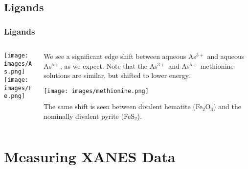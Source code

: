 \documentclass[10pt, xcolor=x11names, compress]{beamer}
\begin{document}
\subsection{Ligands}
\begin{frame}
  \frametitle{Ligands}


  \begin{columns}
    \begin{column}{0.6\linewidth}
      \texttt{[image: images/As.png]}\\
      \texttt{[image: images/Fe.png]}
    \end{column}
    \begin{column}{0.4\linewidth}
      We see a significant edge shift between {\color{Blue3}aqueous
        As$^{3+}$} and {\color{Red2}aqueous As$^{5+}$}, as we expect.
      Note that the {\color{Green4}As$^{3+}$} and
      {\color{Purple4}As$^{5+}$} methionine solutions are similar, but
      shifted to lower energy.

      \texttt{[image: images/methionine.png]}

      The same shift is seen between divalent {\color{Blue3} hematite
        (Fe$_2$O$_3$)} and the nominally divalent {\color{Red2}pyrite
        (FeS$_2$)}.
    \end{column}
  \end{columns}
  \begin{columns}
    \begin{column}{0.6\linewidth}
    \end{column}
    \begin{column}{0.4\linewidth}
    \end{column}
  \end{columns}
\end{frame}


\section[Measure]{Measuring XANES Data}
\end{document}
